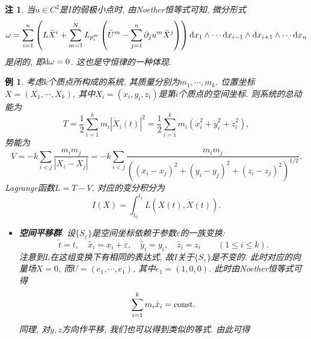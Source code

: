 \documentclass[12pt,a4paper]{article}
\newtheorem{example}[theorem]{例}
\newtheorem{remark}[theorem]{注}
\begin{document}
\begin{remark}
    当$u \in C^2$是$I$的弱极小点时, 由Noether恒等式可知, 微分形式 
    \begin{equation*}
        \omega = \sum_{i = 1}^n\left(L\bar{X}^i + \sum_{m = 1}^NL_{p_i^m}\left(\bar{U}^m - \sum_{j = 1}^n\partial_ju^m\bar{X}^j\right)\right) {\rm d}x_1 \wedge \cdots {\rm d}x_{i - 1} \wedge {\rm d}x_{i + 1} \wedge \cdots {\rm d}x_n
    \end{equation*}
    是闭的, 即${\rm d}\omega = 0$. 这也是守恒律的一种体现.
\end{remark}

\begin{example}
    考虑$k$个质点所构成的系统, 其质量分别为$m_1, \cdots, m_k$.
    位置坐标$X = (X_1, \cdots, X_k)$, 其中$X_i = (x_i, y_i, z_i)$是第$i$个质点的空间坐标.
    则系统的总动能为
    \begin{equation*}
        T = \frac{1}{2}\sum_{i = 1}^km_i|\dot X_i(t)|^2 = \frac{1}{2}\sum_{i = 1}^km_i(\dot x_i^2 + \dot y_i^2 + \dot z_i^2),
    \end{equation*}
    势能为 
    \begin{equation*}
        V = -k\sum_{i < j}\frac{m_im_j}{|X_i - X_j|} = -k\sum_{i < j}\frac{m_im_j}{((x_i - x_j)^2 + (y_i - y_j)^2 + (z_i - z_j)^2)^{1/2}}.
    \end{equation*}
    Lagrange函数$L = T - V$, 对应的变分积分为 
    \begin{equation*}
        I(X) = \int_{t_0}^{t_1}L(X(t), \dot X(t)).
    \end{equation*}
    \begin{itemize}
        \item \textbf{空间平移群}. 设$\{S_{\varepsilon}\}$是空间坐标依赖于参数$\varepsilon$的一族变换:
        \begin{equation*}
            \widetilde{t} = t, \quad \widetilde{x_i} = x_i + \varepsilon, \quad\widetilde{y_i} = y_i, \quad\widetilde{z_i} = z_i \qquad (1 \leq i \leq k).
        \end{equation*}
        注意到$L$在这组变换下有相同的表达式, 故$I$关于$\{S_{\varepsilon}\}$是不变的.
        此时对应的向量场$X = 0$, 而$ U = (e_1, \cdots, e_1)$, 其中$e_1 = (1, 0, 0)$. 
        此时由Noether恒等式可得
        \begin{equation*}
            \sum_{i = 1}^km_i\dot x_i = {\rm const}.
        \end{equation*}
        同理, 对$y, z$方向作平移, 我们也可以得到类似的等式. 由此可得 
        \begin{equation*}

\end{equation*}
\end{itemize}
\end{example}
\end{document}

